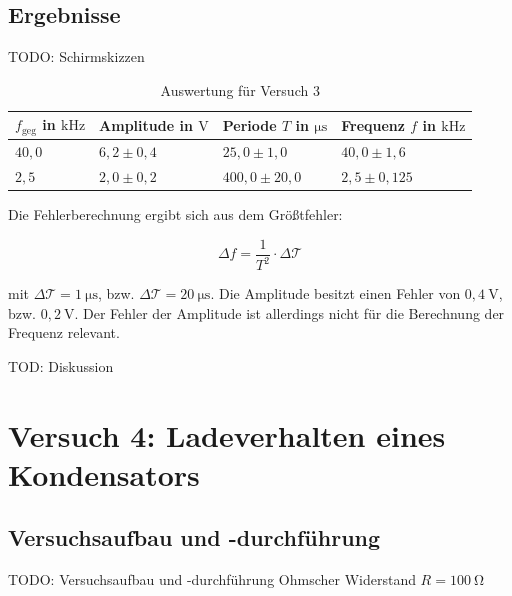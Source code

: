     \subsection{Ergebnisse}

        TODO: Schirmskizzen

        \begin{table}[h!]
            \centering
            \begin{tabular}{|l|l|l|l|}
                \hline
                $f_{\mathrm{geg}}$ in $\mathrm{kHz}$ & Amplitude in $\mathrm{V}$ & Periode $T$ in $\mathrm{\mu s}$ & Frequenz $f$ in $\mathrm{kHz}$\\
                \hline\hline
                $40,0$ & $6,2 \pm 0,4$ & $25,0 \pm 1,0$ & $40,0 \pm 1,6$\\
                \hline
                $2,5$ & $2,0 \pm 0,2$ & $400,0 \pm 20,0$ & $2,5 \pm 0,125$\\
                \hline
            \end{tabular}
            \caption{Auswertung für Versuch 3}
            \label{tab:versuch3}
        \end{table}

        Die Fehlerberechnung ergibt sich aus dem Größtfehler:

        \begin{equation}
            \Delta f = \frac{1}{T^2} \cdot \Delta \mathcal{T}
            \label{eq:größtfehler}
        \end{equation}

        mit $\Delta \mathcal{T} = 1\ \mathrm{\mu s}$, bzw. $\Delta \mathcal{T} = 20\ \mathrm{\mu s}$. Die Amplitude besitzt einen Fehler von $0,4\ \mathrm{V}$, bzw. $0,2\ \mathrm{V}$. Der Fehler der Amplitude ist allerdings nicht für die Berechnung der Frequenz relevant.

        TOD: Diskussion

\section{Versuch 4: Ladeverhalten eines Kondensators}

    \subsection{Versuchsaufbau und -durchführung}

        TODO: Versuchsaufbau und -durchführung
        Ohmscher Widerstand $R = 100\ \mathrm{\Omega}$

